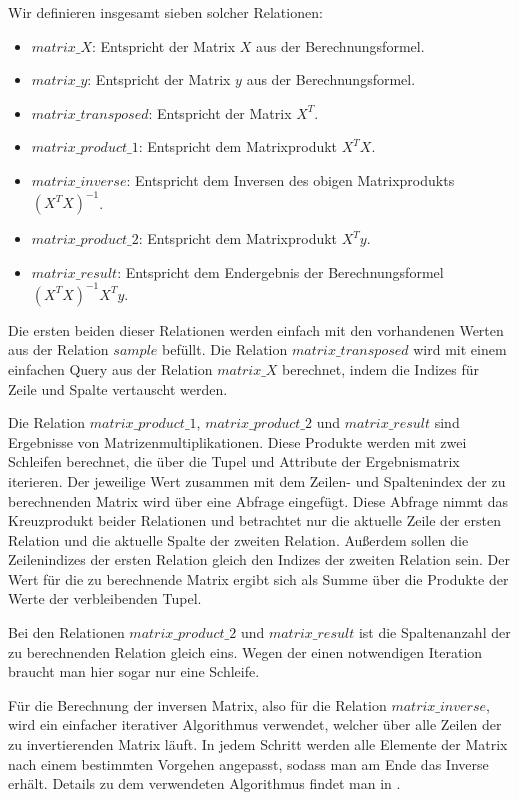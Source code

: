 Wir definieren insgesamt sieben solcher Relationen:
\begin{itemize}
  \item $matrix\_X$: Entspricht der Matrix $X$ aus der Berechnungsformel.
  \item $matrix\_y$: Entspricht der Matrix $y$ aus der Berechnungsformel.
  \item $matrix\_transposed$: Entspricht der Matrix $X^T$.
  \item $matrix\_product\_1$: Entspricht dem Matrixprodukt $X^T X$.
  \item $matrix\_inverse$: Entspricht dem Inversen des obigen Matrixprodukts $(X^T X)^{-1}$.
  \item $matrix\_product\_2$: Entspricht dem Matrixprodukt $X^T y$.
  \item $matrix\_result$: Entspricht dem Endergebnis der Berechnungsformel $(X^T X)^{-1} X^T y$.
\end{itemize}

Die ersten beiden dieser Relationen werden einfach mit den vorhandenen Werten aus der Relation $sample$ befüllt. Die Relation $matrix\_transposed$ wird mit einem einfachen Query aus der Relation $matrix\_X$ berechnet, indem die Indizes für Zeile und Spalte vertauscht werden.

Die Relation $matrix\_product\_1$, $matrix\_product\_2$ und $matrix\_result$ sind Ergebnisse von Matrizenmultiplikationen. Diese Produkte werden mit zwei Schleifen berechnet, die über die Tupel und Attribute der Ergebnismatrix iterieren. Der jeweilige Wert zusammen mit dem Zeilen- und Spaltenindex der zu berechnenden Matrix wird über eine Abfrage eingefügt. Diese Abfrage nimmt das Kreuzprodukt beider Relationen und betrachtet nur die aktuelle Zeile der ersten Relation und die aktuelle Spalte der zweiten Relation. Außerdem sollen die Zeilenindizes der ersten Relation gleich den Indizes der zweiten Relation sein. Der Wert für die zu berechnende Matrix ergibt sich als Summe über die Produkte der Werte der verbleibenden Tupel.

Bei den Relationen $matrix\_product\_2$ und $matrix\_result$ ist die Spaltenanzahl der zu berechnenden Relation gleich eins. Wegen der einen notwendigen Iteration braucht man hier sogar nur eine Schleife.

Für die Berechnung der inversen Matrix, also für die Relation $matrix\_inverse$, wird ein einfacher iterativer Algorithmus verwendet, welcher über alle Zeilen der zu invertierenden Matrix läuft. In jedem Schritt werden alle Elemente der Matrix nach einem bestimmten Vorgehen angepasst, sodass man am Ende das Inverse erhält. Details zu dem verwendeten Algorithmus findet man in \cite{matrix}.

